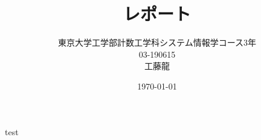 \documentclass[11pt,a4paper]{jsarticle}
\title{レポート}
\author{東京大学工学部計数工学科システム情報学コース3年\\03-190615\\工藤龍}
\date{\today}
\begin{document}
\maketitle

test
\end{document}
